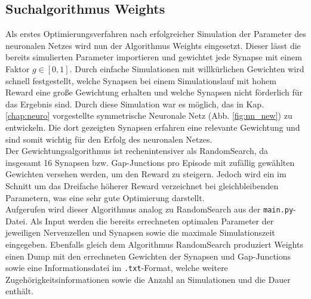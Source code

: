 	\subsection{Suchalgorithmus Weights}
		Als erstes Optimierungsverfahren nach erfolgreicher Simulation der Parameter des neuronalen Netzes wird nun der Algorithmus Weights eingesetzt. Dieser lässt die bereits simulierten Parameter importieren und gewichtet jede Synapse mit einem Faktor $g\in[0,1]$. Durch einfache Simulationen mit willkürlichen Gewichten wird schnell festgestellt, welche Synapsen bei einem Simulationslauf mit hohem Reward eine große Gewichtung erhalten und welche Synapsen nicht förderlich für das Ergebnis sind. Durch diese Simulation war es möglich, das in Kap. \ref{chap:neuro} vorgestellte symmetrische Neuronale Netz (Abb. \ref{fig:nn_new}) zu entwickeln. Die dort gezeigten Synapsen erfahren eine relevante Gewichtung und sind somit wichtig für den Erfolg des neuronalen Netzes.\\
		Der Gewichtungsalgorithmus ist rechenintensiver als RandomSearch, da insgesamt 16 Synapsen bzw. Gap-Junctions pro Episode mit zufällig gewählten Gewichten versehen werden, um den Reward zu steigern. Jedoch wird ein im Schnitt um das Dreifache höherer Reward verzeichnet bei gleichbleibenden Parametern, was eine sehr gute Optimierung darstellt.\\
		Aufgerufen wird dieser Algorithmus analog zu RandomSearch aus der \texttt{main.py}-Datei. Als Input werden die bereits errechneten optimalen Parameter der jeweiligen Nervenzellen und Synapsen sowie die maximale Simulationszeit eingegeben. Ebenfalls gleich dem Algorithmus RandomSearch produziert Weights einen Dump mit den errechneten Gewichten der Synapsen und Gap-Junctions sowie eine Informationsdatei im \texttt{.txt}-Format, welche weitere Zugehörigkeitsinformationen sowie die Anzahl an Simulationen und die Dauer enthält.
		

